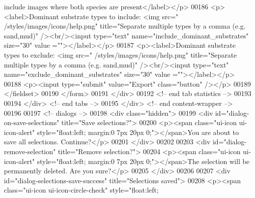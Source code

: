 \begin{DoxyCode}
      include images where both species are present</label></p>
00186                 <p><label>Dominant substrate types to include: <img src=\textcolor{stringliteral}{"
      /styles/images/icons/help.png"} title=\textcolor{stringliteral}{"Separate multiple types by a comma (e.g.
       sand,mud)"} /><br/><input type=\textcolor{stringliteral}{"text"} name=\textcolor{stringliteral}{"include\_dominant\_substrates"} size=\textcolor{stringliteral}{"30"} value
      =\textcolor{stringliteral}{""}></label></p>
00187                 <p><label>Dominant substrate types to exclude: <img src=\textcolor{stringliteral}{"
      /styles/images/icons/help.png"} title=\textcolor{stringliteral}{"Separate multiple types by a comma (e.g.
       sand,mud)"} /><br/><input type=\textcolor{stringliteral}{"text"} name=\textcolor{stringliteral}{"exclude\_dominant\_substrates"} size=\textcolor{stringliteral}{"30"} value
      =\textcolor{stringliteral}{""}></label></p>
00188                 <p><input type=\textcolor{stringliteral}{"submit"} value=\textcolor{stringliteral}{"Export"} \textcolor{keyword}{class}=\textcolor{stringliteral}{"button"} /></p>
00189             </fieldset>
00190             </form>
00191         </div>
00192         <!-- end tab statistics -->
00193 
00194     </div> <!-- end tabs -->
00195     </div> <!-- end content-wrapper -->
00196 
00197     <!-- dialogs -->
00198     <div \textcolor{keyword}{class}=\textcolor{stringliteral}{"hidden"}>
00199         <div \textcolor{keywordtype}{id}=\textcolor{stringliteral}{"dialog-on-save-selections"} title=\textcolor{stringliteral}{"Save selections?"}>
00200             <p><span \textcolor{keyword}{class}=\textcolor{stringliteral}{"ui-icon ui-icon-alert"} style=\textcolor{stringliteral}{"float:left; margin:0
       7px 20px 0;"}></span>You are about to save all selections. Continue?</p>
00201         </div>
00202 
00203         <div \textcolor{keywordtype}{id}=\textcolor{stringliteral}{"dialog-remove-selection"} title=\textcolor{stringliteral}{"Remove selection?"}>
00204             <p><span \textcolor{keyword}{class}=\textcolor{stringliteral}{"ui-icon ui-icon-alert"} style=\textcolor{stringliteral}{"float:left; margin:0
       7px 20px 0;"}></span>The selection will be permanently deleted. Are you sure?</p>
00205         </div>
00206 
00207         <div \textcolor{keywordtype}{id}=\textcolor{stringliteral}{"dialog-selections-save-success"} title=\textcolor{stringliteral}{"Selections saved"}>
00208             <p><span \textcolor{keyword}{class}=\textcolor{stringliteral}{"ui-icon ui-icon-circle-check"} style=\textcolor{stringliteral}{"float:left;
}
\end{DoxyCode}
